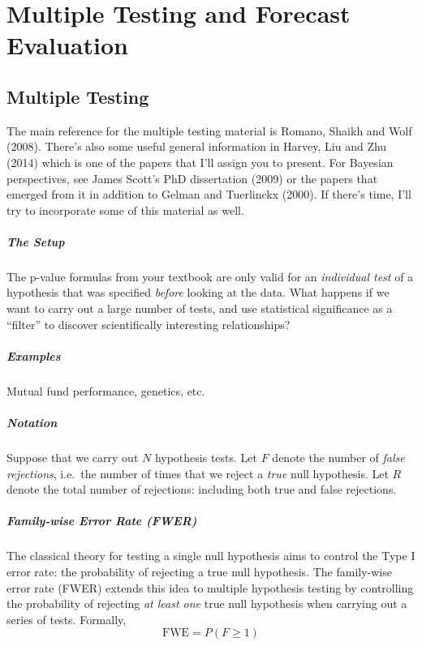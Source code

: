 \chapter{Multiple Testing and Forecast Evaluation}

\section{Multiple Testing}
The main reference for the multiple testing material is Romano, Shaikh and Wolf (2008).
There's also some useful general information in Harvey, Liu and Zhu (2014) which is one of the papers that I'll assign you to present.
For Bayesian perspectives, see James Scott's PhD dissertation (2009) or the papers that emerged from it in addition to Gelman and Tuerlinckx (2000).
If there's time, I'll try to incorporate some of this material as well.

\paragraph{The Setup} 
The p-value formulas from your textbook are only valid for an \emph{individual test} of a hypothesis that was specified \emph{before} looking at the data.
What happens if we want to carry out a large number of tests, and use statistical significance as a ``filter'' to discover scientifically interesting relationships?

\paragraph{Examples}
Mutual fund performance, genetics, etc.

\paragraph{Notation} 
Suppose that we carry out $N$ hypothesis tests.
Let $F$ denote the number of \emph{false rejections}, i.e.\ the number of times that we reject a \emph{true} null hypothesis.
Let $R$ denote the total number of rejections: including both true and false rejections.

\paragraph{Family-wise Error Rate (FWER)}
The classical theory for testing a single null hypothesis aims to control the Type I error rate: the probability of rejecting a true null hypothesis.
The family-wise error rate (FWER) extends this idea to multiple hypothesis testing by controlling the probability of rejecting \emph{at least one} true null hypothesis when carrying out a series of tests.
Formally,
\begin{equation*}
  \mbox{FWE} = P(F\geq 1)
\end{equation*}

